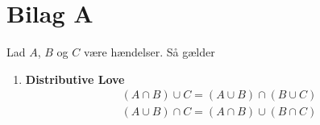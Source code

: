 
\section{Bilag A}
\begin{minipage}\textwidth
\begin{lem}\label{Distributive love} \textbf{} %
\newline
Lad $A$, $B$ og $C$ være hændelser. Så gælder
\begin{enumerate}[label=(\textbf{\alph*})]
    \item \textbf{Distributive Love} \begin{align*}
        (A\cap B)\cup C=(A\cup B)\cap(B\cup C)\\
        (A\cup B)\cap C=(A\cap B)\cup(B\cap C)
    \end{align*}
\end{enumerate}
\end{lem}
\end{minipage}